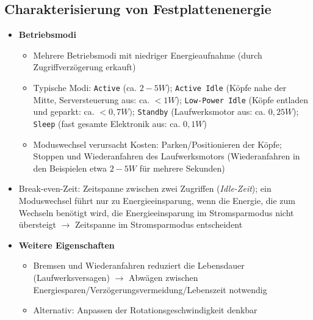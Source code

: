 \subsection{Charakterisierung von Festplattenenergie}
\begin{itemize}
	\item \textbf{Betriebsmodi}
	\begin{itemize}
		\item Mehrere Betriebsmodi mit niedriger Energieaufnahme (durch Zugriffverzögerung erkauft)
		\item Typische Modi: \texttt{Active} (ca. \(2-5W\)); \texttt{Active Idle} (Köpfe nahe der Mitte, Serversteuerung aus: ca. \(<1W\)); \texttt{Low-Power Idle} (Köpfe entladen und geparkt: ca. \(<0,7W)\); \texttt{Standby} (Laufwerksmotor aus: ca. \(0,25W\)); \texttt{Sleep} (fast gesamte Elektronik aus: ca. \(0,1W\))
		\item Moduswechsel verursacht Kosten: Parken/Positionieren der Köpfe; Stoppen und Wiederanfahren des Laufwerksmotors (Wiederanfahren in den Beispielen etwa \(2-5W\) für mehrere Sekunden)
	\end{itemize}
	\item Break-even-Zeit: Zeitspanne zwischen zwei Zugriffen (\textit{Idle-Zeit}); ein Moduswechsel führt nur zu Energieeinsparung, wenn die Energie, die zum Wechseln benötigt wird, die Energieeinsparung im Stromsparmodus nicht übersteigt \(\rightarrow\) Zeitspanne im Stromsparmodus entscheident
	\item \textbf{Weitere Eigenschaften}
	\begin{itemize}
		\item Bremsen und Wiederanfahren reduziert die Lebensdauer (Laufwerksversagen) \(\rightarrow\) Abwägen zwischen Energiesparen/Verzögerungsvermeidung/Lebenszeit notwendig
		\item Alternativ: Anpassen der Rotationsgeschwindigkeit denkbar
	\end{itemize}
\end{itemize}


